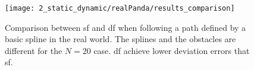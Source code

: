 \begin{figure}[h]
    \centering
    \texttt{[image: 2\_static\_dynamic/realPanda/results\_comparison]}
    \caption{Comparison between \ac{sf} and \ac{df} when following a path defined
      by a basic spline in the real world. 
      The splines and the obstacles are different for the $N=20$ case.
      \ac{df} achieve lower deviation errors that \ac{sf}.
    }%
    \label{fig:experiment2_realPanda_res}
\end{figure}



